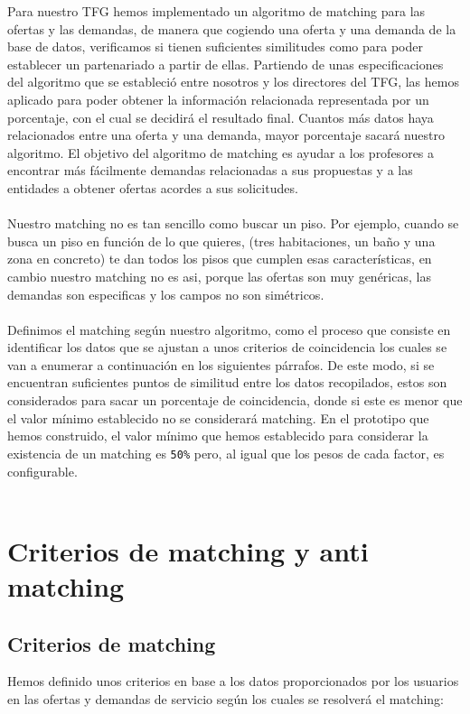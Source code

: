 \documentclass[11pt]{book}
\begin{document}
Para nuestro TFG hemos implementado un algoritmo de matching para las ofertas y las demandas, de manera que cogiendo una oferta y una demanda de la base de datos, verificamos si tienen suficientes similitudes como para poder establecer un partenariado a partir de ellas. Partiendo de unas especificaciones del algoritmo que se estableció entre nosotros y los directores del TFG, las hemos aplicado para poder obtener la información relacionada representada por un porcentaje, con el cual se decidirá el resultado final.  Cuantos más datos haya relacionados entre una oferta y una demanda, mayor porcentaje sacará nuestro algoritmo. El objetivo del algoritmo de matching es ayudar a los profesores a encontrar más fácilmente demandas relacionadas a sus propuestas y a las entidades a obtener ofertas acordes a sus solicitudes. \\\\
Nuestro matching no es tan sencillo como buscar un piso. Por ejemplo, cuando se busca un piso en función de lo que quieres, (tres habitaciones, un baño y una zona en concreto) te dan todos los pisos que cumplen esas características, en cambio nuestro matching no es asi, porque las ofertas son muy genéricas, las demandas son especificas y los campos no son simétricos.\\\\
Definimos el matching según nuestro algoritmo, como el proceso que consiste en identificar los datos que se ajustan a unos criterios de coincidencia los cuales se van a enumerar a continuación en los siguientes párrafos. De este modo, si se encuentran suficientes puntos de similitud entre los datos recopilados, estos son considerados para sacar un porcentaje de coincidencia, donde si este es menor que el valor mínimo establecido no se considerará matching. En el prototipo que hemos construido, el valor mínimo que hemos
establecido para considerar la existencia de un matching es \texttt{50\%} pero, al
igual que los pesos de cada factor, es configurable.
\\\\

\section{Criterios de matching y anti matching}
\subsection{Criterios de matching }

Hemos definido unos criterios en base a los datos proporcionados por los usuarios en las ofertas y demandas de servicio según los cuales se resolverá el matching:
\end{document}

